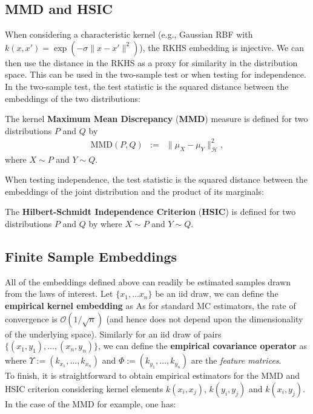 \subsection{MMD and HSIC}
When considering a characteristic kernel (e.g., Gaussian RBF with $k(x,x')=\exp(-\sigma \|x-x'\|^{2})$), the RKHS embedding is injective. We can then use the distance in the RKHS as a proxy for similarity in the distribution space. This can be used in the two-sample test or when testing for independence. In the two-sample test, the test statistic is the squared distance between the embeddings of the two distributions:
\begin{ybox}
The kernel \textbf{Maximum Mean Discrepancy} (\textbf{MMD}) measure is defined for two distributions $P$ and $Q$ by
\begin{eqnarray}
	\text{MMD}(P,Q) &:=& \|\mu_X-\mu_Y\|_{\mathcal H}^2,
\end{eqnarray}
where $X\sim P$ and $Y\sim Q$.
\end{ybox}
When testing independence, the test statistic is the squared distance between the embeddings of the joint distribution and the product of its marginals:
\begin{ybox}
The \textbf{Hilbert-Schmidt Independence Criterion} (\textbf{HSIC}) is defined for two distributions $P$ and $Q$ by
where $X\sim P$ and $Y\sim Q$.
\end{ybox}

\subsection{Finite Sample Embeddings}
All of the embeddings defined above can readily be estimated samples drawn from the laws of interest. Let $\{x_{1},\dots x_{n}\}$ be an iid draw, we can define the \textbf{empirical kernel embedding} as
As for standard MC estimators, the rate of convergence is $\mathcal O(1/\sqrt{n})$ (and hence does not depend upon the dimensionality of the underlying space). Similarly for an iid draw of pairs $\{(x_{1},y_{1}),\dots,(x_{n},y_{n})\}$, we can define the \textbf{empirical covariance operator} as
where $\Upsilon:=(k_{x_1},\dots,k_{x_n})$ and $\Phi:=(k_{y_1},\dots,k_{y_n})$ are the \emph{feature matrices}. \\
To finish, it is straightforward to obtain empirical estimators for the MMD and HSIC criterion considering kernel elements $k(x_i,x_j)$, $k(y_i,y_j)$ and $k(x_i,y_j)$. In the case of the MMD for example, one has:
